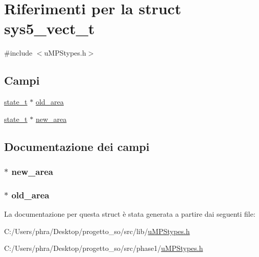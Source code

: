 \hypertarget{structsys5__vect__t}{\section{Riferimenti per la struct sys5\-\_\-vect\-\_\-t}
\label{structsys5__vect__t}
}


{\ttfamily \#include $<$u\-M\-P\-Stypes.\-h$>$}

\subsection*{Campi}
\begin{DoxyCompactItemize}
\item 
\hyperlink{structstate__t}{state\-\_\-t} $\ast$ \hyperlink{structsys5__vect__t_a1666828afe40c79669fb24589f693669}{old\-\_\-area}
\item 
\hyperlink{structstate__t}{state\-\_\-t} $\ast$ \hyperlink{structsys5__vect__t_a9f82661633186f4f5f4c70a5844c00c0}{new\-\_\-area}
\end{DoxyCompactItemize}


\subsection{Documentazione dei campi}
\hypertarget{structsys5__vect__t_a9f82661633186f4f5f4c70a5844c00c0}{
\subsubsection[{new\-\_\-area}]{ $\ast$ new\-\_\-area}}\label{structsys5__vect__t_a9f82661633186f4f5f4c70a5844c00c0}
\hypertarget{structsys5__vect__t_a1666828afe40c79669fb24589f693669}{
\subsubsection[{old\-\_\-area}]{ $\ast$ old\-\_\-area}}\label{structsys5__vect__t_a1666828afe40c79669fb24589f693669}


La documentazione per questa struct è stata generata a partire dai seguenti file\-:\begin{DoxyCompactItemize}
\item 
C\-:/\-Users/phra/\-Desktop/progetto\-\_\-so/src/lib/\hyperlink{lib_2u_m_p_stypes_8h}{u\-M\-P\-Stypes.\-h}\item 
C\-:/\-Users/phra/\-Desktop/progetto\-\_\-so/src/phase1/\hyperlink{phase1_2u_m_p_stypes_8h}{u\-M\-P\-Stypes.\-h}\end{DoxyCompactItemize}
